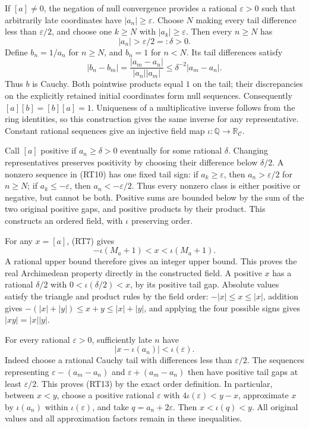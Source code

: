 \documentclass[
  11pt,
]{article}
\begin{document}
If \([a]\ne0\), the negation of null convergence provides a rational
\(\varepsilon>0\) such that arbitrarily late coordinates have
\(|a_n|\ge\varepsilon\). Choose \(N\) making every tail difference less
than \(\varepsilon/2\), and choose one \(k\ge N\) with
\(|a_k|\ge\varepsilon\). Then every \(n\ge N\) has \[
|a_n|>\varepsilon/2=:\delta>0.
\tag{RT10}
\] Define \(b_n=1/a_n\) for \(n\ge N\), and \(b_n=1\) for \(n<N\). Its
tail differences satisfy \[
|b_n-b_m|=\frac{|a_m-a_n|}{|a_n||a_m|}
\le\delta^{-2}|a_m-a_n|.
\tag{RT11}
\] Thus \(b\) is Cauchy. Both pointwise products equal \(1\) on the
tail; their discrepancies on the explicitly retained initial coordinates
form null sequences. Consequently \([a][b]=[b][a]=1\). Uniqueness of a
multiplicative inverse follows from the ring identities, so this
construction gives the same inverse for any representative. Constant
rational sequences give an injective field map
\(\iota:\mathbb Q\to\mathbb R_{\mathcal C}\).

Call \([a]\) positive if \(a_n\ge\delta>0\) eventually for some rational
\(\delta\). Changing representatives preserves positivity by choosing
their difference below \(\delta/2\). A nonzero sequence in (RT10) has
one fixed tail sign: if \(a_k\ge\varepsilon\), then
\(a_n>\varepsilon/2\) for \(n\ge N\); if \(a_k\le-\varepsilon\), then
\(a_n<-\varepsilon/2\). Thus every nonzero class is either positive or
negative, but cannot be both. Positive sums are bounded below by the sum
of the two original positive gaps, and positive products by their
product. This constructs an ordered field, with \(\iota\) preserving
order.

For any \(x=[a]\), (RT7) gives \[
-\iota(M_a+1)<x<\iota(M_a+1).
\tag{RT12}
\] A rational upper bound therefore gives an integer upper bound. This
proves the real Archimedean property directly in the constructed field.
A positive \(x\) has a rational \(\delta/2\) with
\(0<\iota(\delta/2)<x\), by its positive tail gap. Absolute values
satisfy the triangle and product rules by the field order:
\(-|x|\le x\le |x|\), addition gives \(-(|x|+|y|)\le x+y\le |x|+|y|\),
and applying the four possible signs gives \(|xy|=|x||y|\).

For every rational \(\varepsilon>0\), sufficiently late \(n\) have \[
|x-\iota(a_n)|<\iota(\varepsilon).
\tag{RT13}
\] Indeed choose a rational Cauchy tail with differences less than
\(\varepsilon/2\). The sequences representing \(\varepsilon-(a_m-a_n)\)
and \(\varepsilon+(a_m-a_n)\) then have positive tail gaps at least
\(\varepsilon/2\). This proves (RT13) by the exact order definition. In
particular, between \(x<y\), choose a positive rational \(\varepsilon\)
with \(4\iota(\varepsilon)<y-x\), approximate \(x\) by \(\iota(a_n)\)
within \(\iota(\varepsilon)\), and take \(q=a_n+2\varepsilon\). Then
\(x<\iota(q)<y\). All original values and all approximation factors
remain in these inequalities.
\end{document}
